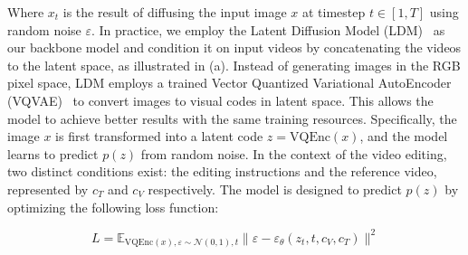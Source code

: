 Where $x_t$ is the result of diffusing the input image $x$ at timestep $t \in [1, T]$ using random noise $\varepsilon$. In practice, we employ the Latent Diffusion Model (LDM)~\cite{ldm} as our backbone model and condition it on input videos by concatenating the videos to the latent space, as illustrated in  (a). Instead of generating images in the RGB pixel space, LDM employs a trained Vector Quantized Variational AutoEncoder (VQVAE)~\cite{vqvae} to convert images to visual codes in latent space. This allows the model to achieve better results with the same training resources. Specifically, the image $x$ is first transformed into a latent code $z = \mathrm{VQEnc}(x)$, and the model learns to predict $p(z)$ from random noise. In the context of the video editing, two distinct conditions exist: the editing instructions and the reference video, represented by $c_T$ and $c_V$ respectively. The model is designed to predict $p(z)$ by optimizing the following loss function:

\begin{equation}\label{eq.ldm_objective}
    L = \mathbb{E}_{\mathrm{VQEnc}(x),\varepsilon\sim\mathcal{N}(0,1),t}\|\varepsilon - \varepsilon_\theta(z_t, t, c_V, c_T)\|^2
\end{equation}

